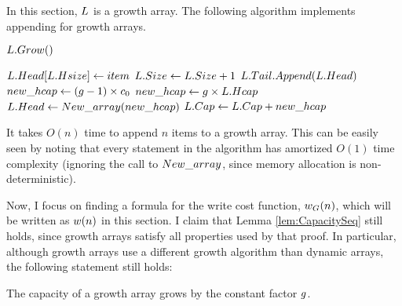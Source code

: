 \HdrGrowthArrayImpl

In this section, $\VarList$ is a growth array. The following algorithm implements appending for growth arrays.

\begin{algorithm}[H]
	\begin{algorithmic}[1]
		\Procedure{$\FuncAppend$}{$\VarList,\ \ParamItem$}
				\State $L.Grow()$
			\EndIf
		
			\State $L.Head[L.Hsize] \gets item$
			\State $L.Size \gets L.Size + 1$
		\EndProcedure
		\Statex
		\Procedure{$\FuncGrow$}{$\VarList$}
			\State $L.Tail.Append(L.Head)$
				\State $new\_hcap \gets (g - 1) \times c_0$
			\Else
				\State $new\_hcap \gets g \times L.Hcap$
			\EndIf
			\State $L.Head \gets New\_array(new\_hcap)$
			\State $L.Cap \gets L.Cap + new\_hcap$
		\EndProcedure
	\end{algorithmic}
\end{algorithm}

\HdrTimeComplex

It takes $O(n)$ time to append $n$ items to a growth array. This can be easily seen by noting that every statement in the algorithm has amortized $O(1)$ time complexity (ignoring the call to $New\_array$, since memory allocation is non-deterministic).

Now, I focus on finding a formula for the write cost function, $w_G(n)$, which will be written as $w(n)$ in this section. I claim that Lemma \ref{lem:CapacitySeq} still holds, since growth arrays satisfy all properties used by that proof. In particular, although growth arrays use a different growth algorithm than dynamic arrays, the following statement still holds:

\begin{lemma}
\label{lem:GrowthArraysGrowthFactor}
	The capacity of a growth array grows by the constant factor $g$.
\end{lemma}

